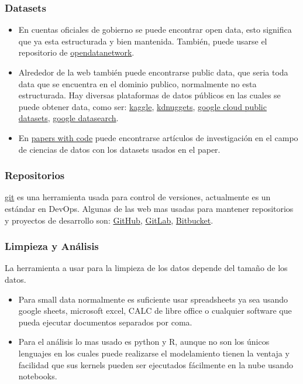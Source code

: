 \documentclass[12pt,a4paper,openright]{article}
\begin{document}
\subsubsection{Datasets}
\begin{itemize}
    \item En cuentas oficiales de gobierno se puede encontrar open data, esto significa que ya esta estructurada y bien mantenida. También, puede usarse el repositorio de \href{https://www.opendatanetwork.com/}{opendatanetwork}.
    \item Alrededor de la web también puede encontrarse public data, que seria toda data que se encuentra en el dominio publico, normalmente no esta estructurada. Hay diversas plataformas de datos públicos en las cuales se puede obtener data, como ser: \href{https://www.kaggle.com/}{kaggle}, \href{https://www.kdnuggets.com/}{kdnuggets}, \href{https://cloud.google.com/solutions/datasets}{google cloud public datasets}, \href{https://datasetsearch.research.google.com/}{google datasearch}.
    \item En \href{https://paperswithcode.com/}{papers with code} puede encontrarse artículos de investigación en el campo de ciencias de datos con los datasets usados en el paper.
\end{itemize}

\subsubsection{Repositorios}
\href{https://git-scm.com/}{git} es una herramienta usada para control de versiones, actualmente es un estándar en DevOps. Algunas de las web mas usadas para mantener repositorios y proyectos de desarrollo son: \href{https://github.com/}{GitHub}, \href{https://about.gitlab.com/}{GitLab}, \href{https://bitbucket.org/product}{Bitbucket}.

\subsubsection{Limpieza y Análisis}
La herramienta a usar para la limpieza de los datos depende del tamaño de los datos. \begin{itemize}
    \item Para small data normalmente es suficiente usar spreadsheets ya sea usando google sheets, microsoft excel, CALC de libre office o cualquier software que pueda ejecutar documentos separados por coma.
    \item Para el análisis lo mas usado es python y R, aunque no son los únicos lenguajes en los cuales puede realizarse el modelamiento tienen la ventaja y facilidad que sus kernels pueden ser ejecutados  fácilmente en la nube usando notebooks.
\end{itemize}
\end{document}
